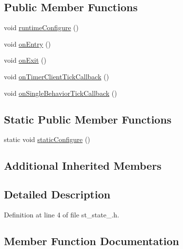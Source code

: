 \subsection*{Public Member Functions}
\begin{DoxyCompactItemize}
\item 
void \hyperlink{structsm__starcraft__ai_1_1StState4_a7748384b94a69b321a74b8d0fbaf4ff9}{runtime\+Configure} ()
\item 
void \hyperlink{structsm__starcraft__ai_1_1StState4_ae129936fd67359c30246b5cb43e4def5}{on\+Entry} ()
\item 
void \hyperlink{structsm__starcraft__ai_1_1StState4_a5e1e42f9a673fef6ace6aca1e33c3b77}{on\+Exit} ()
\item 
void \hyperlink{structsm__starcraft__ai_1_1StState4_ae4099642b687669c625d2bc3187fd58d}{on\+Timer\+Client\+Tick\+Callback} ()
\item 
void \hyperlink{structsm__starcraft__ai_1_1StState4_a6e7d0364b55391f49967e341091c5a84}{on\+Single\+Behavior\+Tick\+Callback} ()
\end{DoxyCompactItemize}
\subsection*{Static Public Member Functions}
\begin{DoxyCompactItemize}
\item 
static void \hyperlink{structsm__starcraft__ai_1_1StState4_a4065f780fec254596687bd59caf96f63}{static\+Configure} ()
\end{DoxyCompactItemize}
\subsection*{Additional Inherited Members}


\subsection{Detailed Description}


Definition at line 4 of file st\+\_\+state\+\_.\+h.



\subsection{Member Function Documentation}
